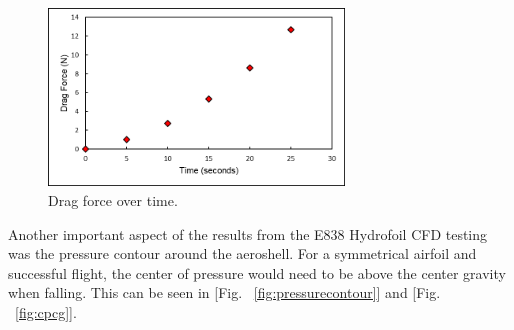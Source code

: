 \begin{figure}[H]
  \centering
  \includegraphics[width=0.7\textwidth]{Aeroshell/drag_relation.png}
  \caption{\label{fig:dragforce}Drag force over time.}
\end{figure}

\begin{table}[H]
\caption{\label{tab:cfdvelocity}Drag force and drag coefficient values from 0 – 25 seconds.}
\centering
{}
\end{table}

\indent\indent Another important aspect of the results from the E838 Hydrofoil CFD testing was the pressure contour around the aeroshell. For a symmetrical airfoil and successful flight, the center of pressure would need to be above the center gravity when falling. This can be seen in [Fig. ~\ref{fig:pressurecontour}] and [Fig. ~\ref{fig:cpcg}].

